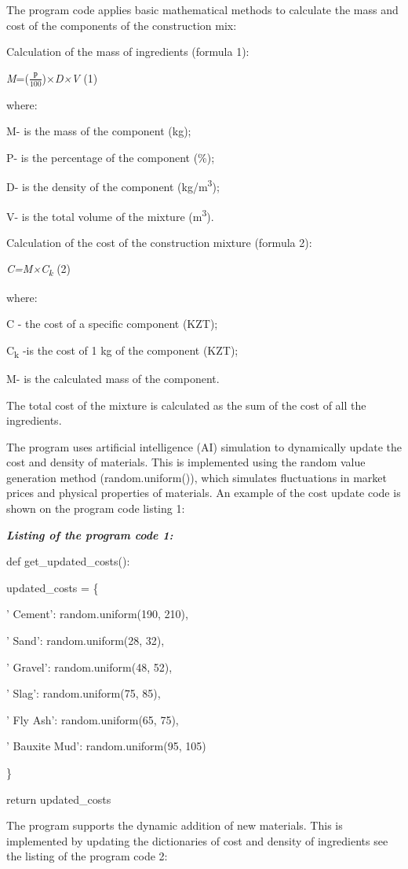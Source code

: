 {The program code applies basic mathematical methods to calculate the
mass and cost of the components of the construction mix:

Calculation of the mass of ingredients (formula 1):

\emph{M}=(\(\frac{Р}{100}\))×\emph{D×V} (1)

where:

M- is the mass of the component (kg);

P- is the percentage of the component (\%);

D- is the density of the component (kg/m\textsuperscript{3});

V- is the total volume of the mixture (m\textsuperscript{3}).

Calculation of the cost of the construction mixture (formula 2):

\emph{C=M×C\textsubscript{k}} (2)

where:

C - the cost of a specific component (KZT);

C\textsubscript{k} -is the cost of 1 kg of the component (KZT);

M- is the calculated mass of the component.

The total cost of the mixture is calculated as the sum of the cost of
all the ingredients.

The program uses artificial intelligence (AI) simulation to dynamically
update the cost and density of materials. This is implemented using the
random value generation method (random.uniform()), which simulates
fluctuations in market prices and physical properties of materials. An
example of the cost update code is shown on the program code listing 1:

\emph{{\bfseries Listing of the program code 1:}}

def get\_updated\_costs():

updated\_costs = \{

' Cement': random.uniform(190, 210),

' Sand': random.uniform(28, 32),

' Gravel': random.uniform(48, 52),

' Slag': random.uniform(75, 85),

' Fly Ash': random.uniform(65, 75),

' Bauxite Mud': random.uniform(95, 105)

\}

return updated\_costs

The program supports the dynamic addition of new materials. This is
implemented by updating the dictionaries of cost and density of
ingredients see the listing of the program code 2:

}
